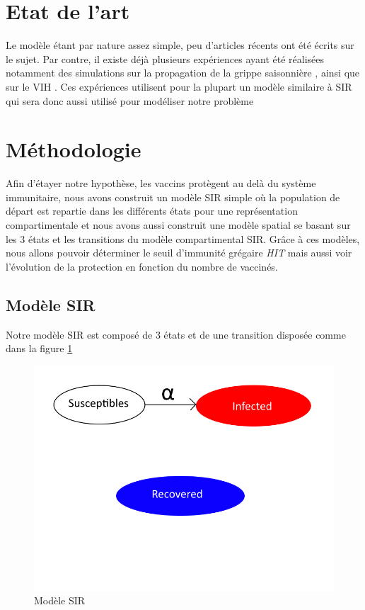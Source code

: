 \documentclass[journal, a4paper]{IEEEtran}
\begin{document}
\section{Etat de l'art}
	Le modèle étant par nature assez simple, peu d'articles récents ont été écrits sur le sujet. Par contre, il existe déjà plusieurs expériences ayant été réalisées notamment des simulations sur la propagation de la grippe saisonnière \cite{pandemic_influenza} \cite{influenza_HIT}, ainsi que sur le VIH \cite{VIH}. Ces expériences utilisent pour la plupart un modèle similaire à SIR qui sera donc aussi utilisé pour modéliser notre problème

\section{Méthodologie}\label{sec:met}
	Afin d'étayer notre hypothèse, les vaccins protègent au delà du système immunitaire, nous avons construit un modèle SIR simple où la population de départ est repartie dans les différents états pour une représentation compartimentale et nous avons aussi construit une modèle spatial se basant sur les 3 états et les transitions du modèle compartimental SIR.
	Grâce à ces modèles, nous allons pouvoir déterminer le seuil d'immunité grégaire \emph{HIT} mais aussi voir l'évolution de la protection en fonction du nombre de vaccinés.
	\subsection{Modèle SIR}
	Notre modèle SIR est composé de 3 états et de une transition disposée comme dans la figure \ref{fig:MySIR}

	\begin{figure}
		\includegraphics[scale=0.4]{MySIR}
		\caption{Modèle SIR}
		\label{fig:MySIR}
	\end{figure}
\end{document}
